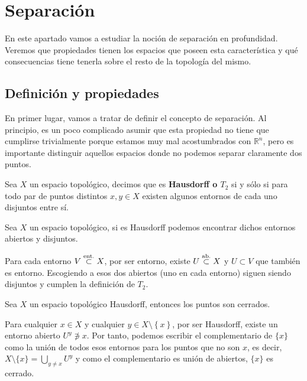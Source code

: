\chapter{Separación}%
\label{cha:separacion}
En este apartado vamos a estudiar la noción de separación en profundidad. Veremos que propiedades tienen los espacios que poseen esta característica y qué consecuencias tiene tenerla sobre el resto de la topología del mismo.

\section{Definición y propiedades}%
\label{sec:concepto}

En primer lugar, vamos a tratar de definir el concepto de separación. Al principio, es un poco complicado asumir que esta propiedad no tiene que cumplirse trivialmente porque estamos muy mal acostumbrados con $\mathbb{R}^n$, pero es importante distinguir aquellos espacios donde no podemos separar claramente dos puntos.

\begin{defi}
Sea $X$ un espacio topológico, decimos que es \textbf{Hausdorff o $T_2$} si y sólo si para todo par de puntos distintos $x, y \in X$ existen algunos entornos de cada uno disjuntos entre sí.
\end{defi}

\begin{prop}
Sea $X$ un espacio topológico, si es Hausdorff podemos encontrar dichos entornos abiertos y disjuntos.
\end{prop}
\begin{demo}
Para cada entorno $V \stackrel{\text{ent.}}{\subset} X$, por ser entorno, existe $U\stackrel{\text{ab.}}{\subset} X$ y $U\subset V$ que también es entorno. Escogiendo a esos dos abiertos (uno en cada entorno) siguen siendo disjuntos y cumplen la definición de $T_2$.
\end{demo}

\begin{prop}
Sea $X$ un espacio topológico Hausdorff, entonces los puntos son cerrados.
\end{prop}
\begin{demo}    
Para cualquier $x \in X$ y cualquier $y \in X \setminus \left\{ x \right\}$, por ser Hausdorff, existe un entorno abierto $U^y \not\ni x$. Por tanto, podemos escribir el complementario de $\{x\}$ como la unión de todos esos entornos para los puntos que no son $x$, es decir, $X \setminus \{x\} = \bigcup_{y \neq x} U^y$ y como el complementario es unión de abiertos, $\{x\}$ es cerrado.
\end{demo}

